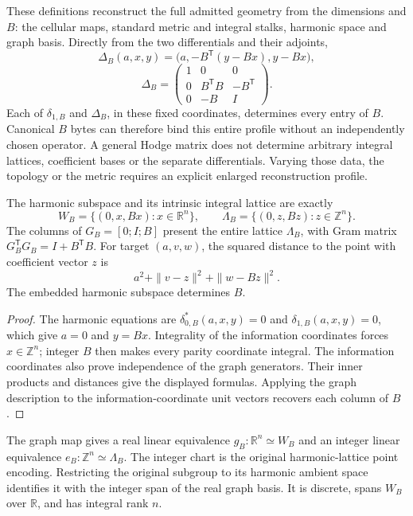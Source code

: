 These definitions reconstruct the full admitted geometry from the dimensions
and \(B\): the cellular maps, standard metric and integral stalks, harmonic
space and graph basis. Directly from the two differentials and their adjoints,
\[
 \Delta_B(a,x,y)=\bigl(a,-B^{\mathsf T}(y-Bx),y-Bx\bigr),
\]
\[
 \Delta_B=
 \begin{pmatrix}
  1&0&0\\0&B^{\mathsf T}B&-B^{\mathsf T}\\0&-B&I
 \end{pmatrix}.
\]
Each of \(\delta_{1,B}\) and \(\Delta_B\), in these fixed coordinates,
determines every entry of \(B\). Canonical \(B\) bytes can therefore bind this
entire profile without an independently chosen operator. A general Hodge
matrix does not determine arbitrary integral lattices, coefficient bases or
the separate differentials. Varying those data, the topology or the metric
requires an explicit enlarged reconstruction profile.

\begin{proposition}
\label{prop:coupled-harmonic-graph}
The harmonic subspace and its intrinsic integral lattice are exactly
\[
 W_B=\{(0,x,Bx):x\in\mathbb R^n\},\qquad
 \Lambda_B=\{(0,z,Bz):z\in\mathbb Z^n\}.
\]
The columns of \(G_B=[0;I;B]\) present the entire lattice \(\Lambda_B\), with
Gram matrix \(G_B^{\mathsf T}G_B=I+B^{\mathsf T}B\). For target \((a,v,w)\),
the squared distance to the point with coefficient vector \(z\) is
\[
 a^2+\|v-z\|^2+\|w-Bz\|^2.
\]
The embedded harmonic subspace determines \(B\).
\end{proposition}

\begin{proof}
The harmonic equations are \(\delta_{0,B}^*(a,x,y)=0\) and
\(\delta_{1,B}(a,x,y)=0\), which give \(a=0\) and \(y=Bx\).
Integrality of the information coordinates forces \(x\in\mathbb Z^n\);
integer \(B\) then makes every parity coordinate integral. The information
coordinates also prove independence of the graph generators. Their inner
products and distances give the displayed formulas. Applying the graph
description to the information-coordinate unit vectors recovers each column
of \(B\).
\end{proof}

\begin{proposition}
\label{prop:coupled-intrinsic-lattice}
The graph map gives a real linear equivalence
\(g_B:\mathbb R^n\simeq W_B\) and an integer linear equivalence
\(e_B:\mathbb Z^n\simeq\Lambda_B\). The integer chart is the original
harmonic-lattice point encoding. Restricting the original subgroup to its
harmonic ambient space identifies it with the integer span of the real graph
basis. It is discrete, spans \(W_B\) over \(\mathbb R\), and has integral
rank \(n\).
\end{proposition}

